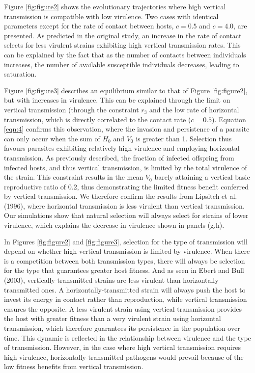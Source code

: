 Figure \ref{fig:figure2} shows the evolutionary trajectories where high vertical transmission is compatible with low virulence. Two cases with identical parameters except for the rate of contact between hosts, $c = 0.5$ and $c = 4.0$, are presented. As predicted in the original study, an increase in the rate of contact selects for less virulent strains exhibiting high vertical transmission rates. This can be explained by the fact that as the number of contacts between individuals increases, the number of available susceptible individuals decreases, leading to saturation.

Figure \ref{fig:figure3} describes an equilibrium similar to that of Figure \ref{fig:figure2}, but with increases in virulence. This can be explained through the limit on vertical transmission (through the constraint $r_3$ \in [0, $r_1$] and the low rate of horizontal transmission, which is directly correlated to the contact rate ($c = 0.5$). Equation \ref{eqn:4} confirms this observation, where the invasion and persistence of a parasite can only occur when the sum of $H_0$ and $V_0$ is greater than 1. Selection thus favours parasites exhibiting relatively high virulence and employing horizontal transmission. As previously described, the fraction of infected offspring from infected hosts, and thus vertical transmission, is limited by the total virulence of the strain. This constraint results in the mean $V_0$ barely attaining a vertical basic reproductive ratio of 0.2, thus demonstrating the limited fitness benefit conferred by vertical transmission. We therefore confirm the results from Lipsitch et al. (1996)\supercite{Lipsitch:1996}, where horizontal transmission is less virulent than vertical transmission. Our simulations show that natural selection will always select for strains of lower virulence, which explains the decrease in virulence shown in panels (g,h).

In Figures \ref{fig:figure2} and \ref{fig:figure3}, selection for the type of transmission will depend on whether high vertical transmission is limited by virulence. When there is a competition between both transmission types, there will always be selection for the type that guarantees greater host fitness. And as seen in Ebert and Bull (2003), vertically-transmitted strains are less virulent than horizontally-transmitted ones. A horizontally-transmitted strain will always push the host to invest its energy in contact rather than reproduction, while vertical transmission ensures the opposite. A less virulent strain using vertical transmission provides the host with greater fitness than a very virulent strain using horizontal transmission, which therefore guarantees its persistence in the population over time. This dynamic is reflected in the relationship between virulence and the type of transmission\supercite{Levin:1996}. However, in the case where high vertical transmission requires high virulence, horizontally-transmitted pathogens would prevail because of the low fitness benefits from vertical transmission.

